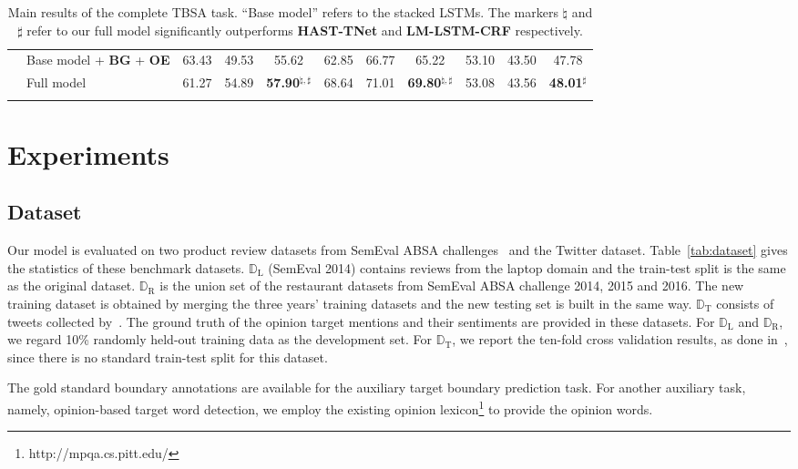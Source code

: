\documentclass[letterpaper]{article} \usepackage{aaai19}  \usepackage{times}  \usepackage{helvet}  \usepackage{courier}  \usepackage{url}  \usepackage{graphicx}  \frenchspacing  \setlength{\pdfpagewidth}{8.5in}  \setlength{\pdfpageheight}{11in}
\begin{document}
\begin{table*}[]
\begin{tabular}{ll|ccc|ccc|ccc}
        & Base model + \textbf{BG} + \textbf{OE} & 63.43 & 49.53 & 55.62 & 62.85 & 66.77 & 65.22 & 53.10 & 43.50 & 47.78 \\
        & Full model & 61.27 & 54.89 & \textbf{57.90}$^{\natural,\sharp}$ & 68.64 & 71.01 & \textbf{69.80}$^{\natural,\sharp}$ & 53.08 & 43.56 & \textbf{48.01}$^{\sharp}$ \\
        \Xhline{3\arrayrulewidth}
    \end{tabular}
    \caption{Main results of the complete TBSA task. ``Base model'' refers to the stacked LSTMs. The markers $\natural$ and $\sharp$ refer to our full model significantly outperforms \textbf{HAST-TNet} and \textbf{LM-LSTM-CRF} respectively.}
    \label{tab:main_results}
\end{table*}


\section{Experiments}
\subsection{Dataset}
Our model is evaluated on two product review datasets from SemEval ABSA challenges~\cite{S14-2004,S15-2082,S16-1002} and the Twitter dataset. Table~\ref{tab:dataset} gives the statistics of these benchmark datasets. $\mathbb{D}_{\mathrm{L}}$ (SemEval 2014) contains reviews from the laptop domain and the train-test split is the same as the original dataset. $\mathbb{D}_{\mathrm{R}}$ is the union set of the restaurant datasets from SemEval ABSA challenge 2014, 2015 and 2016. The new training dataset is obtained by merging the three years' training datasets and the new testing set is built in the same way. $\mathbb{D}_{\mathrm{T}}$ consists of tweets collected by~\cite{D13-1171}. The ground truth of the opinion target mentions and their sentiments are provided in these datasets. For $\mathbb{D}_{\mathrm{L}}$ and $\mathbb{D}_{\mathrm{R}}$, we regard 10\% randomly held-out training data as the development set. For $\mathbb{D}_{\mathrm{T}}$, we report the ten-fold cross validation results, as done in~\cite{D13-1171,D15-1073}, since there is no standard train-test split for this dataset. 

The gold standard boundary annotations are available for the auxiliary target boundary prediction task. For another auxiliary task, namely, opinion-based target word detection, we employ the existing opinion lexicon\footnote{http://mpqa.cs.pitt.edu/} to provide the opinion words. 
\end{document}

